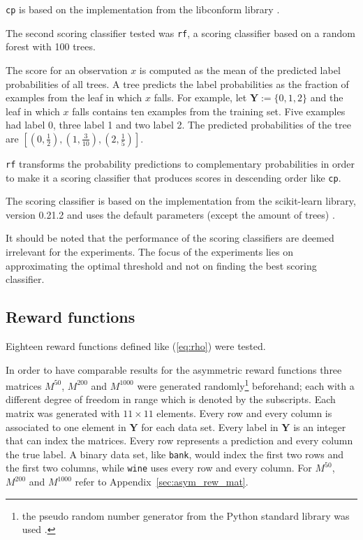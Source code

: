 \documentclass[twoside,11pt]{article}
\def\Y{\textbf{Y}}
\begin{document}
\texttt{cp} is based on the implementation from the
libconform library \citep[see][]{fassbender_2019}.

The second scoring classifier tested was \texttt{rf},
a scoring classifier based on a random forest with 100
trees.

The score for an observation $x$ is computed as the mean
of the predicted label probabilities of all trees.
A tree predicts the label probabilities as the fraction
of examples from the leaf in which $x$ falls.
For example, let $\Y := \{0,1,2\}$ and the leaf in which
$x$ falls contains ten examples from the training set.
Five examples had label 0, three label 1 and two label 2.
The predicted probabilities of the tree are
$[(0,\frac{1}{2}), (1,\frac{3}{10}), (2,\frac{1}{5})]$.

\texttt{rf} transforms the probability predictions to
complementary probabilities in order to make it a scoring
classifier that produces scores in descending order like
\texttt{cp}.

The scoring classifier is based on the implementation from
the scikit-learn library, version 0.21.2 and uses the
default parameters (except the amount of trees)
\citep[see][]{sklearn_api}.

It should be noted that the performance of the scoring
classifiers are deemed irrelevant for the experiments.
The focus of the experiments lies on approximating the
optimal threshold and not on finding the best scoring
classifier.

\subsection{Reward functions}

Eighteen reward functions defined like (\ref{eq:rho}) were
tested.

In order to have comparable results for the asymmetric
reward functions three matrices $M^{50}$, $M^{200}$
and $M^{1000}$ were generated randomly\footnote{%
  the pseudo random number generator from the
  Python standard library was used
  \citep[see][Chapter 9.6]{python}.}
beforehand; each with a different degree of freedom in
range which is denoted by the subscripts.
Each matrix was generated with $11 \times 11$ elements.
Every row and every column is associated to one element
in $\Y$ for each data set.
Every label in $\Y$ is an integer that can index the
matrices.
Every row represents a prediction and every column the
true label.
A binary data set, like \texttt{bank}, would index the
first two rows and the first two columns, while
\texttt{wine} uses every row and every column.
For $M^{50}$, $M^{200}$ and $M^{1000}$ refer to
Appendix~\ref{sec:asym_rew_mat}.
\end{document}
